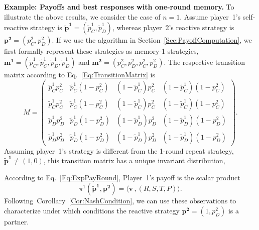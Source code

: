 \documentclass[11pt]{article}
\theoremstyle{plainCl1}
\theoremstyle{plainCl2}
\begin{document}
\noindent
{\bf Example: Payoffs and best responses with one-round memory.}
To illustrate the above results, we consider the case of $n\!=\!1$. 
Assume player~1's self-reactive strategy is $\mathbf{\tilde p^1} = (\tilde p_C^1, \tilde p_D^1)$, 
whereas player~2's reactive strategy is $\mathbf{p^2} = (p^2_C, p^2_D)$. 
If we use the algorithm in Section~\ref{Sec:PayoffComputation}, we first formally represent these strategies as memory-1 strategies, $\mathbf{m^1} = (\tilde p_C^1, \tilde p_C^1,  \tilde p_D^1,  \tilde p_D^1)$ and $\mathbf{m^2} = (p_C^2, p_D^2,  p_C^2,  p_D^2)$.
The respective transition matrix according to Eq.~\eqref{Eq:TransitionMatrix} is
\begin{equation} \label{Eq:TransitionM1}
M=\left(
\begin{array}{cccc}
\tilde p^1_C p^2_C	&\tilde p^1_C(1\!-\!p^2_C)	&(1\!-\!\tilde p^1_C)p^2_C	&(1\!-\!\tilde p^1_C)(1\!-\!p^2_C)\\
\tilde p^1_C p^2_C	&\tilde p^1_C(1\!-\!p^2_C)	&(1\!-\!\tilde p^1_C)p^2_C	&(1\!-\!\tilde p^1_C)(1\!-\!p^2_C)\\
\tilde p^1_D p^2_D	&\tilde p^1_D(1\!-\!p^2_D)	&(1\!-\!\tilde p^1_D)p^2_D	&(1\!-\!\tilde p^1_D)(1\!-\!p^2_D)\\
\tilde p^1_D p^2_D	&\tilde p^1_D(1\!-\!p^2_D)	&(1\!-\!\tilde p^1_D)p^2_D	&(1\!-\!\tilde p^1_D)(1\!-\!p^2_D)
\end{array}
\right).
\end{equation}
Assuming player~1's strategy is different from the 1-round repeat strategy, $\mathbf{\tilde p^1} \!\neq\! (1,0)$, this transition matrix has a unique invariant distribution,
{\begin{center}
\end{center}}
\noindent
According to Eq.~\eqref{Eq:ExpPayRound}, Player~1's payoff is the scalar product 
\begin{equation} \label{Eq:PayExample}
\pi^1(\mathbf{\tilde p^1},\mathbf{p^2})=\big\langle\mathbf{v}\, , (R,S,T,P)\big\rangle.
\end{equation} 
Following~Corollary~\ref{Cor:NashCondition}, we can use these observations to characterize under which conditions the reactive strategy $\mathbf{p^2}\!=\!(1,p^2_D)$ is a partner. 
\end{document}

